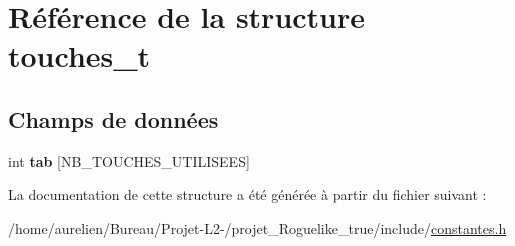\hypertarget{structtouches__t}{}\section{Référence de la structure touches\+\_\+t}
\label{structtouches__t}
\subsection*{Champs de données}
\begin{DoxyCompactItemize}
\item 
\mbox{\label{structtouches__t_a7f306b2dfc357765b0bdaba659e45132}} 
int {\bfseries tab} \mbox{[}N\+B\+\_\+\+T\+O\+U\+C\+H\+E\+S\+\_\+\+U\+T\+I\+L\+I\+S\+E\+ES\mbox{]}
\end{DoxyCompactItemize}


La documentation de cette structure a été générée à partir du fichier suivant \+:\begin{DoxyCompactItemize}
\item 
/home/aurelien/\+Bureau/\+Projet-\/\+L2-\//projet\+\_\+\+Roguelike\+\_\+true/include/\hyperlink{constantes_8h}{constantes.\+h}\end{DoxyCompactItemize}
